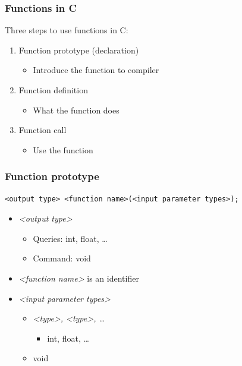 \documentclass{../c-lecture}
\begin{document}
\begin{frame}
  \frametitle{Functions in C}
  Three steps to use functions in C:\@
  \begin{enumerate}
    \item Function prototype (declaration)
    \begin{itemize}
      \item Introduce the function to compiler
    \end{itemize}
    \item Function definition
    \begin{itemize}
      \item What the function does
    \end{itemize}
    \item Function call
    \begin{itemize}
      \item Use the function
    \end{itemize}
  \end{enumerate}
\end{frame}

\begin{frame}[fragile]
  \frametitle{Function \textbf{prototype}}
  \begin{verbatim}
<output type> <function name>(<input parameter types>);
  \end{verbatim}
  \begin{itemize}
    \item \textit{\color{VioletRed} <output type>}
    \begin{itemize}
      \item \textmd{\color{Orange} Queries}: int, float, \ldots
      \item \textmd{\color{LimeGreen} Command}: void
    \end{itemize}
    \item
      \textit{\color{LimeGreen} <function name>} is an identifier
    \item \textit{\color{Cyan} <input parameter types>}
    \begin{itemize}
      \item \textit{<type>, <type>, \ldots}
      \begin{itemize}
        \item int, float, \ldots
      \end{itemize}
      \item void
    \end{itemize}
  \end{itemize}
\end{frame}
\end{document}
